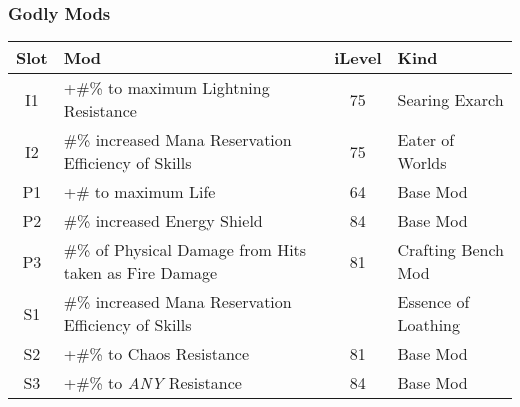 \subsubsection{Godly Mods}
\begin{tabular}{|c|l|c|l|}
	\hline
	Slot&Mod&iLevel&Kind\\\hline
	I1& +\#\% to maximum Lightning Resistance&75& Searing Exarch \\\hline
	I2& \#\% increased Mana Reservation Efficiency of Skills&75& Eater of Worlds \\\hline\hline
	P1& +\# to maximum Life&64& Base Mod \\\hline
	P2& \#\% increased Energy Shield&84& Base Mod \\\hline
	P3&\#\% of Physical Damage from Hits taken as Fire Damage&81& Crafting Bench Mod \\\cline{2-4}
	S1&\#\% increased Mana Reservation Efficiency of Skills&&Essence of Loathing \\\hline
	S2&+\#\% to Chaos Resistance&81&Base Mod \\\hline
	S3&+\#\% to \emph{ANY} Resistance&84&Base Mod \\\hline
\end{tabular}

